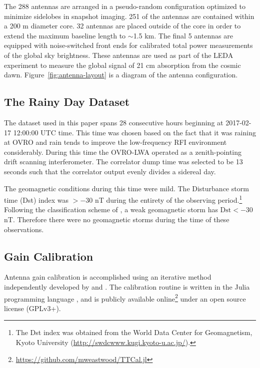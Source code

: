 \documentclass[twocolumn]{aastex61}
\begin{document}
The 288 antennas are arranged in a pseudo-random configuration optimized to minimize sidelobes in
snapshot imaging.  251 of the antennas are contained within a 200 m diameter core. 32 antennas are
placed outside of the core in order to extend the maximum baseline length to $\sim$1.5 km. The final
5 antennas are equipped with noise-switched front ends for calibrated total power measurements of
the global sky brightness.  These antennas are used as part of the LEDA experiment
\citep{todo_price_2017} to measure the global signal of 21 cm absorption from the cosmic dawn.
Figure~\ref{fig:antenna-layout} is a diagram of the antenna configuration.

\subsection{The Rainy Day Dataset}

The dataset used in this paper spans 28 consecutive hours beginning at 2017-02-17 12:00:00 UTC time.
This time was chosen based on the fact that it was raining at OVRO and rain tends to improve the
low-frequency RFI environment considerably. During this time the OVRO-LWA operated as a
zenith-pointing drift scanning interferometer.  The correlator dump time was selected to be 13
seconds such that the correlator output evenly divides a sidereal day.

The geomagnetic conditions during this time were mild. The Disturbance storm time (Dst) index was
$>-30$ nT during the entirety of the observing period.\footnote{
    The Dst index was obtained from the World Data Center for Geomagnetism, Kyoto University
    (\url{http://swdcwww.kugi.kyoto-u.ac.jp/}).
}
Following the classification scheme of \citet{2008GMS...181.....K}, a weak geomagnetic storm has
$\text{Dst} < -30$ nT. Therefore there were no geomagnetic storms during the time of these
observations.

\subsection{Gain Calibration}

Antenna gain calibration is accomplished using an iterative method independently developed by
\citet{2008ISTSP...2..707M} and \citet{2014A&A...571A..97S}. The calibration routine is written in
the Julia programming language \citep{doi:10.1137/141000671}, and is publicly available
online\footnote{\url{https://github.com/mweastwood/TTCal.jl}} under an open source license (GPLv3+).
\end{document}
